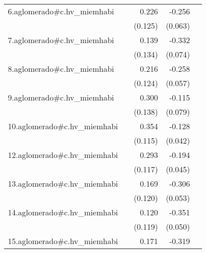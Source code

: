 {\begin{longtable}{l*{4}{D{.}{.}{-1}}}
\addlinespace
6.aglomerado#c.hv\_miemhabi&                     &       0.226         &      -0.256\sym{***}&                     \\
            &                     &     (0.125)         &     (0.063)         &                     \\
\addlinespace
7.aglomerado#c.hv\_miemhabi&                     &       0.139         &      -0.332\sym{***}&                     \\
            &                     &     (0.134)         &     (0.074)         &                     \\
\addlinespace
8.aglomerado#c.hv\_miemhabi&                     &       0.216         &      -0.258\sym{***}&                     \\
            &                     &     (0.124)         &     (0.057)         &                     \\
\addlinespace
9.aglomerado#c.hv\_miemhabi&                     &       0.300\sym{*}  &      -0.115         &                     \\
            &                     &     (0.138)         &     (0.079)         &                     \\
\addlinespace
10.aglomerado#c.hv\_miemhabi&                     &       0.354\sym{**} &      -0.128\sym{**} &                     \\
            &                     &     (0.115)         &     (0.042)         &                     \\
\addlinespace
12.aglomerado#c.hv\_miemhabi&                     &       0.293\sym{*}  &      -0.194\sym{***}&                     \\
            &                     &     (0.117)         &     (0.045)         &                     \\
\addlinespace
13.aglomerado#c.hv\_miemhabi&                     &       0.169         &      -0.306\sym{***}&                     \\
            &                     &     (0.120)         &     (0.053)         &                     \\
\addlinespace
14.aglomerado#c.hv\_miemhabi&                     &       0.120         &      -0.351\sym{***}&                     \\
            &                     &     (0.119)         &     (0.050)         &                     \\
\addlinespace
15.aglomerado#c.hv\_miemhabi&                     &       0.171         &      -0.319\sym{***}&                     \\

\end{longtable}}
